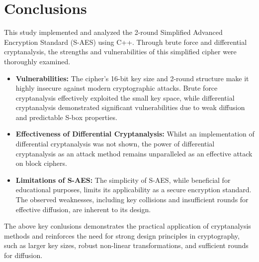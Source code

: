 \documentclass{article}
\begin{document}
\section{Conclusions}
This study implemented and analyzed the 2-round Simplified Advanced Encryption Standard (S-AES) using C++. Through brute force and differential cryptanalysis, the strengths and vulnerabilities of this simplified cipher were thoroughly examined. 
\begin{itemize}
    \item \textbf{Vulnerabilities:} The cipher's 16-bit key size and 2-round structure make it highly insecure against modern cryptographic attacks. Brute force cryptanalysis effectively exploited the small key space, while differential cryptanalysis demonstrated significant vulnerabilities due to weak diffusion and predictable S-box properties.

    \item \textbf{Effectiveness of Differential Cryptanalysis:} Whilst an implementation of differential cryptanalysis was not shown, the power of differential cryptanalysis as an attack method remains unparalleled as an effective attack on block ciphers.

    \item \textbf{Limitations of S-AES:} The simplicity of S-AES, while beneficial for educational purposes, limits its applicability as a secure encryption standard. The observed weaknesses, including key collisions and insufficient rounds for effective diffusion, are inherent to its design.
\end{itemize}

The above key conlusions demonstrates the practical application of cryptanalysis methods and reinforces the need for strong design principles in cryptography, such as larger key sizes, robust non-linear transformations, and sufficient rounds for diffusion. 
\newpage

\end{document}
